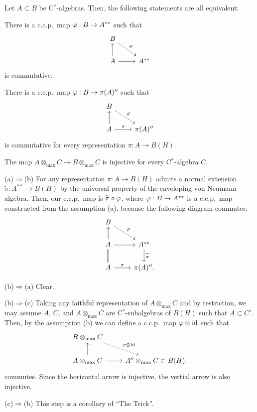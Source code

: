 \documentclass{../../../small}
\begin{document}
\begin{cor}
Let $A\subset B$ be C$^*$-algebras.
Then, the following statements are all equivalent:
\begin{parts}
\item There is a c.c.p.~map $\varphi: B\to A^{**}$ such that
\[\begin{tikzcd}
 B\ar[dashed]{dr}{\f}&\\
 A\ar{u}\ar{r}& A^{**}
\end{tikzcd}\]
is commutative.
\item There is a c.c.p.~map $\varphi: B\to\pi(A)''$ such that
\[\begin{tikzcd}
 B\ar[dashed]{dr}{\f}&\\
 A\ar{u}\ar{r}{\pi}&\pi(A)''
\end{tikzcd}\]
is commutative for every representation $\pi:A\to B(H)$.
\item The map $A\otimes_{\max} C\to B\otimes_{\max} C$ is injective for every C$^*$-algebra $ C$.
\end{parts}
\end{cor}
\begin{pf}
(a)$\Rightarrow$(b)
For any representation $\pi:A\to B(H)$ admits a normal extension $\tilde\pi:A^{**}\to B(H)$ by the universal property of the enveloping von Neumann algebra.
Then, our c.c.p.~map is $\widetilde\pi\circ\varphi$, where $\varphi: B\to A^{**}$ is a c.c.p.~map constructed from the assumption (a), because the following diagram commutes:
\[\begin{tikzcd}
 B\ar[dashed]{dr}{\f}&\\
 A\ar{u}\ar{r}& A^{**}\ar{d}{\tilde\pi}\\
 A\ar[equal]{u}\ar{r}{\pi}&\pi(A)''.
\end{tikzcd}\]

(b)$\Rightarrow$(a)
Clear.

(b)$\Rightarrow$(c)
Taking any faithful representation of $A\otimes_{\max} C$ and by restriction, we may assume $A$, $ C$, and $A\otimes_{\max} C$ are C$^*$-subalgebras of $B(H)$ such that $A\subset C'$.
Then, by the assumption (b) we can define a c.c.p.~map $\varphi\otimes\operatorname{id}$ such that
\[\begin{tikzcd}
 B\otimes_{\max} C\ar[dashed]{dr}{\f\otimes\id}&\\
 A\otimes_{\max} C\ar{u}\ar{r}& A''\otimes_{\max} C\subset B(H).
\end{tikzcd}\]
commutes.
Since the horizontal arrow is injective, the vertial arrow is also injective.

(c)$\Rightarrow$(b)
This step is a corollary of ``The Trick''.
\end{pf}
\end{document}
